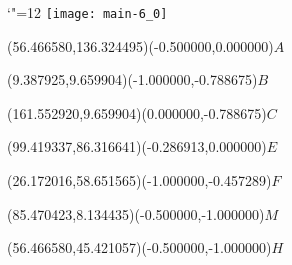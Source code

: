 \documentclass[12pt]{article}
\begin{document}
\makeatletter%
\let\ASYencoding\f@encoding%
\let\ASYfamily\f@family%
\let\ASYseries\f@series%
\let\ASYshape\f@shape%
\makeatother%
{\catcode`"=12%
\texttt{[image: main-6\_0]}%
}%
\kern -170.716535pt%
%
%
\fontsize{10.000000}{12.000000}\selectfont%
\usefont{\ASYencoding}{\ASYfamily}{\ASYseries}{\ASYshape}%
\ASYalign(56.466580,136.324495)(-0.500000,0.000000){$A$}%
%
%
\fontsize{10.000000}{12.000000}\selectfont%
\ASYalign(9.387925,9.659904)(-1.000000,-0.788675){$B$}%
%
%
\fontsize{10.000000}{12.000000}\selectfont%
\ASYalign(161.552920,9.659904)(0.000000,-0.788675){$C$}%
%
%
\fontsize{10.000000}{12.000000}\selectfont%
\ASYalign(99.419337,86.316641)(-0.286913,0.000000){$E$}%
%
%
\fontsize{10.000000}{12.000000}\selectfont%
\ASYalign(26.172016,58.651565)(-1.000000,-0.457289){$F$}%
%
%
\fontsize{10.000000}{12.000000}\selectfont%
\ASYalign(85.470423,8.134435)(-0.500000,-1.000000){$M$}%
%
%
\fontsize{10.000000}{12.000000}\selectfont%
\ASYalign(56.466580,45.421057)(-0.500000,-1.000000){$H$}%
\end{document}
